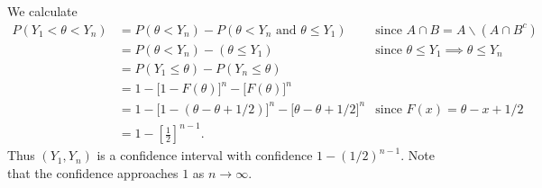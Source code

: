 \documentclass{stat_homework}
\begin{document}
\begin{solution}
  We calculate 
\begin{align*}
  P(Y_1 < \theta < Y_n) &= P( \theta< Y_n) - P(\theta< Y_n \text{ and }\theta \le Y_1 ) &\text{since }A\cap B=A\backslash \left(A\cap B^c\right)\\
  &= P(\theta <Y_n) - (\theta \le Y_1) &\text{since }\theta \le Y_1 \implies \theta \le Y_n\\
  &= P(Y_1 \le \theta) - P(Y_n \le \theta)\\
  &= 1 - \big[1-F(\theta)\big]^n - \big[F(\theta)\big]^n\\
  &= 1 - \big[1-(\theta-\theta+1/2)\big]^n - \big[\theta-\theta+1/2\big]^n &\text{since }F(x)=\theta-x+1/2\\
  &= 1 - \left[\frac 12\right]^{n-1}.
\end{align*}
Thus $(Y_1,Y_n)$ is a confidence interval with confidence $1-(1/2)^{n-1}$. Note that the confidence approaches $1$ as $n \to \infty$.
\end{solution}
\end{document}
